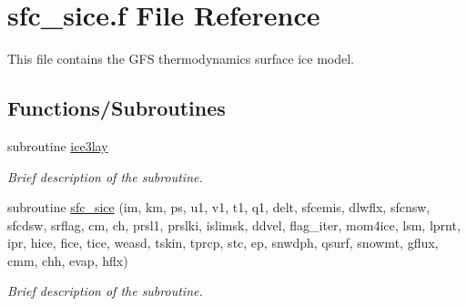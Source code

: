 \hypertarget{sfc__sice_8f}{}\section{sfc\+\_\+sice.\+f File Reference}
\label{sfc__sice_8f}


This file contains the G\+FS thermodynamics surface ice model.  


\subsection*{Functions/\+Subroutines}
\begin{DoxyCompactItemize}
\item 
subroutine \hyperlink{group___g_f_s___ice_ga18fd9a43fb519c32737074cf8f02a496}{ice3lay}
\begin{DoxyCompactList}\small\item\em Brief description of the subroutine. \end{DoxyCompactList}\end{DoxyCompactItemize}
\textbf{ }\par
\begin{DoxyCompactItemize}
\item 
subroutine \hyperlink{group___g_f_s___ice_ga9cc05261a34162c47424df528f679ede}{sfc\+\_\+sice} (im, km, ps, u1, v1, t1, q1, delt, sfcemis, dlwflx, sfcnsw, sfcdsw, srflag, cm, ch, prsl1, prslki, islimsk, ddvel, flag\+\_\+iter, mom4ice, lsm, lprnt, ipr, hice, fice, tice, weasd, tskin, tprcp, stc, ep, snwdph, qsurf, snowmt, gflux, cmm, chh, evap, hflx)
\begin{DoxyCompactList}\small\item\em Brief description of the subroutine. \end{DoxyCompactList}\end{DoxyCompactItemize}

